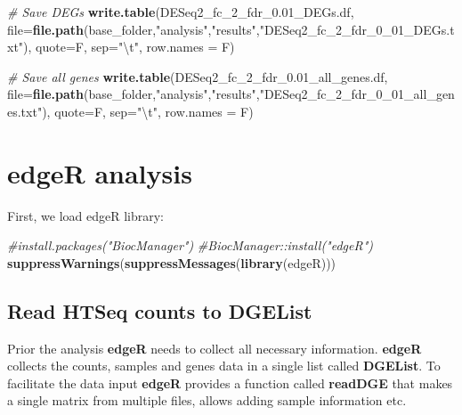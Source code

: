 \documentclass[]{book}
\newenvironment{Shaded}{\begin{snugshade}}{\end{snugshade}}
\newcommand{\KeywordTok}[1]{\textcolor[rgb]{0.13,0.29,0.53}{\textbf{#1}}}
\newcommand{\DataTypeTok}[1]{\textcolor[rgb]{0.13,0.29,0.53}{#1}}
\newcommand{\FloatTok}[1]{\textcolor[rgb]{0.00,0.00,0.81}{#1}}
\newcommand{\CharTok}[1]{\textcolor[rgb]{0.31,0.60,0.02}{#1}}
\newcommand{\StringTok}[1]{\textcolor[rgb]{0.31,0.60,0.02}{#1}}
\newcommand{\CommentTok}[1]{\textcolor[rgb]{0.56,0.35,0.01}{\textit{#1}}}
\newcommand{\NormalTok}[1]{#1}
\begin{document}
\begin{Shaded}
\begin{Highlighting}[]
\CommentTok{# Save DEGs}
\KeywordTok{write.table}\NormalTok{(DESeq2_fc_2_fdr_}\FloatTok{0.}\NormalTok{01_DEGs.df, }
            \DataTypeTok{file=}\KeywordTok{file.path}\NormalTok{(base_folder,}\StringTok{"analysis"}\NormalTok{,}\StringTok{"results"}\NormalTok{,}\StringTok{"DESeq2_fc_2_fdr_0_01_DEGs.txt"}\NormalTok{),}
            \DataTypeTok{quote=}\NormalTok{F, }\DataTypeTok{sep=}\StringTok{"}\CharTok{\textbackslash{}t}\StringTok{"}\NormalTok{, }\DataTypeTok{row.names =}\NormalTok{ F)}

\CommentTok{# Save all genes}
\KeywordTok{write.table}\NormalTok{(DESeq2_fc_2_fdr_}\FloatTok{0.}\NormalTok{01_all_genes.df, }
            \DataTypeTok{file=}\KeywordTok{file.path}\NormalTok{(base_folder,}\StringTok{"analysis"}\NormalTok{,}\StringTok{"results"}\NormalTok{,}\StringTok{"DESeq2_fc_2_fdr_0_01_all_genes.txt"}\NormalTok{),}
            \DataTypeTok{quote=}\NormalTok{F, }\DataTypeTok{sep=}\StringTok{"}\CharTok{\textbackslash{}t}\StringTok{"}\NormalTok{, }\DataTypeTok{row.names =}\NormalTok{ F)}
\end{Highlighting}
\end{Shaded}

\chapter{edgeR analysis}\label{edger-analysis-1}

First, we load edgeR library:

\begin{Shaded}
\begin{Highlighting}[]
\CommentTok{#install.packages("BiocManager")}
\CommentTok{#BiocManager::install("edgeR")}
\KeywordTok{suppressWarnings}\NormalTok{(}\KeywordTok{suppressMessages}\NormalTok{(}\KeywordTok{library}\NormalTok{(edgeR)))}
\end{Highlighting}
\end{Shaded}

\section{Read HTSeq counts to
DGEList}\label{read-htseq-counts-to-dgelist}

Prior the analysis \textbf{edgeR} needs to collect all necessary
information. \textbf{edgeR} collects the counts, samples and genes data
in a single list called \textbf{DGEList}. To facilitate the data input
\textbf{edgeR} provides a function called \textbf{readDGE} that makes a
single matrix from multiple files, allows adding sample information etc.
\end{document}
